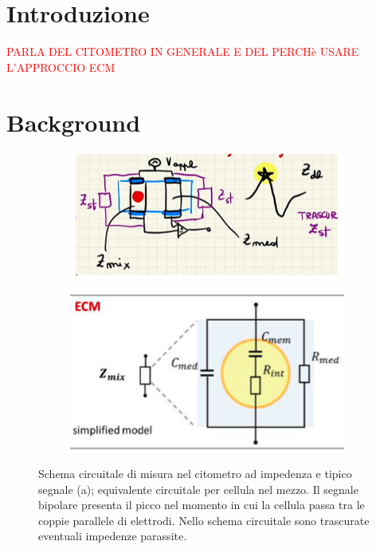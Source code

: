\section{Introduzione}

\textcolor{red}{PARLA DEL CITOMETRO IN GENERALE E DEL PERCHè USARE L'APPROCCIO ECM}

\textcolor{blue}{\lipsum[1]}

\section{Background}

\begin{figure}[h!]
	\begin{subfigure}{0.5\linewidth}
			\centering
				\includegraphics[width=0.95\linewidth]{figures/modello_circuitale}
				\caption{}
	\end{subfigure}\hfill
	\begin{subfigure}{0.5\linewidth}
	\centering
	\includegraphics[width=0.5\linewidth]{figures/modello_circuitale1}
	\caption{}
\end{subfigure}\hfill
	\caption{Schema circuitale di misura nel citometro ad impedenza e tipico segnale (a); equivalente circuitale per cellula nel mezzo. Il segnale bipolare presenta il picco nel momento in cui la cellula passa tra le coppie parallele di elettrodi. Nello schema circuitale sono trascurate eventuali impedenze parassite.}
	\label{fig:modellocircuitale}
\end{figure}



